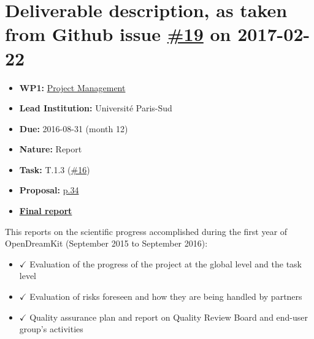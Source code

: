 \section*{\texorpdfstring{Deliverable description, as taken from Github
issue
\href{https://github.com/OpenDreamKit/OpenDreamKit/issues/19}{\#19} on
2017-02-22}{Deliverable description, as taken from Github issue \#19 on 2017-02-22}}\label{deliverable-description-as-taken-from-github-issue-19-on-2017-02-22}

\begin{itemize}
\tightlist
\item
  \textbf{WP1:}
  \href{https://github.com/OpenDreamKit/OpenDreamKit/tree/master/WP1}{Project
  Management}
\item
  \textbf{Lead Institution:} Université Paris-Sud
\item
  \textbf{Due:} 2016-08-31 (month 12)
\item
  \textbf{Nature:} Report
\item
  \textbf{Task:} T.1.3
  (\href{https://github.com/OpenDreamKit/OpenDreamKit/issues/16}{\#16})
\item
  \textbf{Proposal:}
  \href{https://github.com/OpenDreamKit/OpenDreamKit/raw/master/Proposal/proposal-www.pdf}{p.34}
\item
  \textbf{\href{https://github.com/OpenDreamKit/OpenDreamKit/raw/master/WP1/D1.3/report-final.pdf}{Final
  report}}
\end{itemize}

This reports on the scientific progress accomplished during the first
year of OpenDreamKit (September 2015 to September 2016):

\begin{itemize}
\tightlist
\item
  \(\checkmark\) Evaluation of the progress of the project at the global
  level and the task level
\item
  \(\checkmark\) Evaluation of risks foreseen and how they are being
  handled by partners
\item
  \(\checkmark\) Quality assurance plan and report on Quality Review
  Board and end-user group's activities
\end{itemize}
